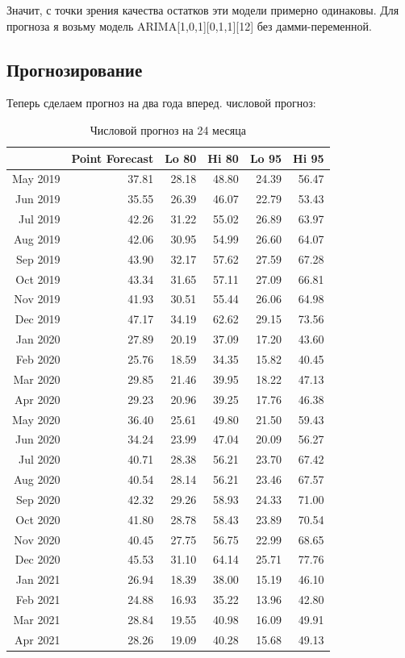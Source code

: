 \documentclass[14pt, a4paper]{extarticle}\usepackage[]{graphicx}\usepackage[]{color}
\begin{document}
Значит, с точки зрения качества остатков эти модели примерно одинаковы. Для прогноза я возьму модель  ARIMA[1,0,1][0,1,1][12] без дамми-переменной.

\subsection{Прогнозирование}

Теперь сделаем прогноз на два года  вперед.
числовой прогноз:



\begin{table}[ht]
\centering
\begin{tabular}{rrrrrr}
  \hline
 & Point Forecast & Lo 80 & Hi 80 & Lo 95 & Hi 95 \\ 
  \hline
May 2019 & 37.81 & 28.18 & 48.80 & 24.39 & 56.47 \\ 
  Jun 2019 & 35.55 & 26.39 & 46.07 & 22.79 & 53.43 \\ 
  Jul 2019 & 42.26 & 31.22 & 55.02 & 26.89 & 63.97 \\ 
  Aug 2019 & 42.06 & 30.95 & 54.99 & 26.60 & 64.07 \\ 
  Sep 2019 & 43.90 & 32.17 & 57.62 & 27.59 & 67.28 \\ 
  Oct 2019 & 43.34 & 31.65 & 57.11 & 27.09 & 66.81 \\ 
  Nov 2019 & 41.93 & 30.51 & 55.44 & 26.06 & 64.98 \\ 
  Dec 2019 & 47.17 & 34.19 & 62.62 & 29.15 & 73.56 \\ 
  Jan 2020 & 27.89 & 20.19 & 37.09 & 17.20 & 43.60 \\ 
  Feb 2020 & 25.76 & 18.59 & 34.35 & 15.82 & 40.45 \\ 
  Mar 2020 & 29.85 & 21.46 & 39.95 & 18.22 & 47.13 \\ 
  Apr 2020 & 29.23 & 20.96 & 39.25 & 17.76 & 46.38 \\ 
  May 2020 & 36.40 & 25.61 & 49.80 & 21.50 & 59.43 \\ 
  Jun 2020 & 34.24 & 23.99 & 47.04 & 20.09 & 56.27 \\ 
  Jul 2020 & 40.71 & 28.38 & 56.21 & 23.70 & 67.42 \\ 
  Aug 2020 & 40.54 & 28.14 & 56.21 & 23.46 & 67.57 \\ 
  Sep 2020 & 42.32 & 29.26 & 58.93 & 24.33 & 71.00 \\ 
  Oct 2020 & 41.80 & 28.78 & 58.43 & 23.89 & 70.54 \\ 
  Nov 2020 & 40.45 & 27.75 & 56.75 & 22.99 & 68.65 \\ 
  Dec 2020 & 45.53 & 31.10 & 64.14 & 25.71 & 77.76 \\ 
  Jan 2021 & 26.94 & 18.39 & 38.00 & 15.19 & 46.10 \\ 
  Feb 2021 & 24.88 & 16.93 & 35.22 & 13.96 & 42.80 \\ 
  Mar 2021 & 28.84 & 19.55 & 40.98 & 16.09 & 49.91 \\ 
  Apr 2021 & 28.26 & 19.09 & 40.28 & 15.68 & 49.13 \\ 
   \hline
\end{tabular}
\caption{Числовой прогноз на 24 месяца} 
\end{table}
\end{document}
